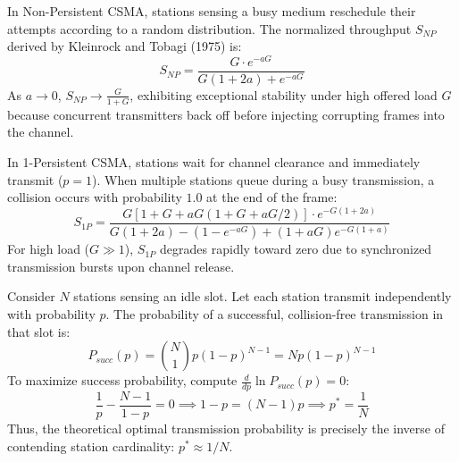 \documentclass[11pt,a4paper]{article}
\begin{document}
\begin{proofbox}
In Non-Persistent CSMA, stations sensing a busy medium reschedule their attempts according to a random distribution. The normalized throughput $S_{NP}$ derived by Kleinrock and Tobagi (1975) is:
\begin{equation}
    S_{NP} = \frac{G \cdot e^{-aG}}{G(1 + 2a) + e^{-aG}}
\end{equation}
As $a \to 0$, $S_{NP} \to \frac{G}{1 + G}$, exhibiting exceptional stability under high offered load $G$ because concurrent transmitters back off before injecting corrupting frames into the channel.
\end{proofbox}

\begin{proofbox}
In 1-Persistent CSMA, stations wait for channel clearance and immediately transmit ($p=1$). When multiple stations queue during a busy transmission, a collision occurs with probability $1.0$ at the end of the frame:
\begin{equation}
    S_{1P} = \frac{G[1 + G + aG(1 + G + aG/2)] \cdot e^{-G(1 + 2a)}}{G(1 + 2a) - (1 - e^{-aG}) + (1 + aG)e^{-G(1 + a)}}
\end{equation}
For high load ($G \gg 1$), $S_{1P}$ degrades rapidly toward zero due to synchronized transmission bursts upon channel release.
\end{proofbox}

\begin{proofbox}
Consider $N$ stations sensing an idle slot. Let each station transmit independently with probability $p$. The probability of a successful, collision-free transmission in that slot is:
\begin{equation}
    P_{succ}(p) = \binom{N}{1} p (1 - p)^{N - 1} = N p (1 - p)^{N - 1}
\end{equation}
To maximize success probability, compute $\frac{d}{dp}\ln P_{succ}(p) = 0$:
\begin{equation}
    \frac{1}{p} - \frac{N - 1}{1 - p} = 0 \implies 1 - p = (N - 1)p \implies p^* = \frac{1}{N}
\end{equation}
Thus, the theoretical optimal transmission probability is precisely the inverse of contending station cardinality: $p^* \approx 1/N$.
\end{proofbox}
\end{document}
